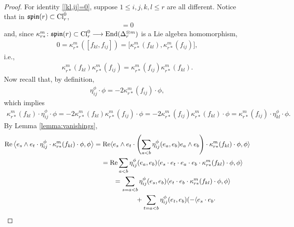 \documentclass[10pt,a4paper]{amsart}
\newcommand{\lra}{\longrightarrow}
\numberwithin{equation}{section}
\begin{document}
\begin{proof} For identity \eqref{[kl,ij]=0}, suppose $1\leq i,j,k,l\leq r$ are all different. Notice that in $\mathfrak{spin}(r)\subset {\rm Cl}_r^0$,
\begin{gather*}[f_{kl},f_{ij}]=0\end{gather*}
and, since $\kappa_{r*}^m\colon \mathfrak{spin}(r)\subset {\rm Cl}_r^0 \lra \operatorname{End}(\Delta_r^{\otimes m})$ is a Lie algebra homomorphism,
\begin{gather*}
 0 = \kappa_{r*}^m([f_{kl},f_{ij}]) = \big[\kappa_{r*}^m(f_{kl}),\kappa_{r*}^m(f_{ij})\big],
\end{gather*}
i.e.,
\begin{gather*}\kappa_{r*}^m(f_{kl})\kappa_{r*}^m(f_{ij}) =\kappa_{r*}^m(f_{ij})\kappa_{r*}^m(f_{kl}).\end{gather*}
Now recall that, by definition,
\begin{gather*}\eta_{ij}^\phi\cdot\phi = -2 \kappa_{r*}^m(f_{ij})\cdot \phi,\end{gather*}
which implies
\begin{gather*}
\kappa_{r*}^m(f_{kl})\cdot\eta_{ij}^\phi\cdot \phi = -2 \kappa_{r*}^m(f_{kl})\kappa_{r*}^m(f_{ij})\cdot\phi
= -2 \kappa_{r*}^m(f_{ij})\kappa_{r*}^m(f_{kl})\cdot\phi=\kappa_{r*}^m(f_{ij})\cdot\eta_{kl}^\phi\cdot \phi.
\end{gather*}
By Lemma \ref{lemma:vanishings},
\begin{gather*}
\operatorname{Re}\big\langle e_s\wedge e_t \cdot \eta_{ij}^\phi\cdot \kappa_{r*}^m(f_{kl})\cdot\phi,\phi\big\rangle
 = \operatorname{Re}\langle e_s\wedge e_t \cdot \left(\sum_{a<b}\eta_{ij}^\phi(e_a,e_b)e_a\wedge e_b\right)\cdot
\kappa_{r*}^m(f_{kl})\cdot\phi,\phi\rangle \\
\hphantom{\operatorname{Re}\big\langle e_s\wedge e_t \cdot \eta_{ij}^\phi\cdot \kappa_{r*}^m(f_{kl})\cdot\phi,\phi\big\rangle}{}
= \operatorname{Re}\sum_{a<b}\eta_{ij}^\phi(e_a,e_b)\langle e_s\cdot e_t \cdot e_a\cdot e_b\cdot
\kappa_{r*}^m(f_{kl})\cdot\phi,\phi\rangle \\
\hphantom{\operatorname{Re}\big\langle e_s\wedge e_t \cdot \eta_{ij}^\phi\cdot \kappa_{r*}^m(f_{kl})\cdot\phi,\phi\big\rangle}{}
= \sum_{s=a<b}\eta_{ij}^\phi(e_s,e_b)\langle e_t \cdot e_b\cdot
\kappa_{r*}^m(f_{kl})\cdot\phi,\phi\rangle \\
\hphantom{\operatorname{Re}\big\langle e_s\wedge e_t \cdot \eta_{ij}^\phi\cdot \kappa_{r*}^m(f_{kl})\cdot\phi,\phi\big\rangle=}{}
 +\sum_{t=a<b}\eta_{ij}^\phi(e_t,e_b)(-\langle e_s\cdot e_b\cdot

\end{gather*}
\end{proof}
\end{document}
